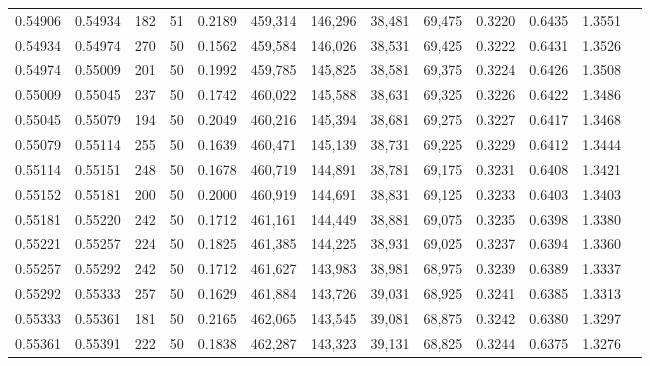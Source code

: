 \begin{tabular}{rrrrrrrrrrrrr}
0.54906 & 0.54934 &   182 &  51 &                                     0.2189 & 459,314 & 146,296 &  38,481 &  69,475 & 0.3220 & 0.6435 & 1.3551 \\
0.54934 & 0.54974 &   270 &  50 &                                     0.1562 & 459,584 & 146,026 &  38,531 &  69,425 & 0.3222 & 0.6431 & 1.3526 \\
0.54974 & 0.55009 &   201 &  50 &                                     0.1992 & 459,785 & 145,825 &  38,581 &  69,375 & 0.3224 & 0.6426 & 1.3508 \\
0.55009 & 0.55045 &   237 &  50 &                                     0.1742 & 460,022 & 145,588 &  38,631 &  69,325 & 0.3226 & 0.6422 & 1.3486 \\
0.55045 & 0.55079 &   194 &  50 &                                     0.2049 & 460,216 & 145,394 &  38,681 &  69,275 & 0.3227 & 0.6417 & 1.3468 \\
0.55079 & 0.55114 &   255 &  50 &                                     0.1639 & 460,471 & 145,139 &  38,731 &  69,225 & 0.3229 & 0.6412 & 1.3444 \\
0.55114 & 0.55151 &   248 &  50 &                                     0.1678 & 460,719 & 144,891 &  38,781 &  69,175 & 0.3231 & 0.6408 & 1.3421 \\
0.55152 & 0.55181 &   200 &  50 &                                     0.2000 & 460,919 & 144,691 &  38,831 &  69,125 & 0.3233 & 0.6403 & 1.3403 \\
0.55181 & 0.55220 &   242 &  50 &                                     0.1712 & 461,161 & 144,449 &  38,881 &  69,075 & 0.3235 & 0.6398 & 1.3380 \\
0.55221 & 0.55257 &   224 &  50 &                                     0.1825 & 461,385 & 144,225 &  38,931 &  69,025 & 0.3237 & 0.6394 & 1.3360 \\
0.55257 & 0.55292 &   242 &  50 &                                     0.1712 & 461,627 & 143,983 &  38,981 &  68,975 & 0.3239 & 0.6389 & 1.3337 \\
0.55292 & 0.55333 &   257 &  50 &                                     0.1629 & 461,884 & 143,726 &  39,031 &  68,925 & 0.3241 & 0.6385 & 1.3313 \\
0.55333 & 0.55361 &   181 &  50 &                                     0.2165 & 462,065 & 143,545 &  39,081 &  68,875 & 0.3242 & 0.6380 & 1.3297 \\
0.55361 & 0.55391 &   222 &  50 &                                     0.1838 & 462,287 & 143,323 &  39,131 &  68,825 & 0.3244 & 0.6375 & 1.3276 \\

\end{tabular}
